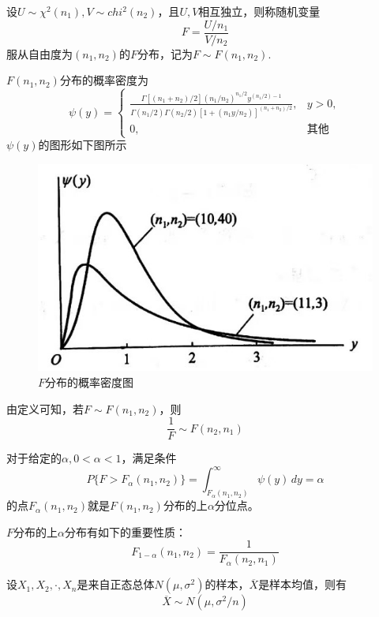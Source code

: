 \begin{definition}[$F$分布]
    设$U\sim \chi^2(n_1),V\sim chi^2(n_2)$，且$U,V$相互独立，则称随机变量
    $$F=\frac{U/n_1}{V/n_2}$$
    服从自由度为$(n_1,n_2)$的{\heiti $F$分布}，记为$F\sim F(n_1,n_2)$.

    $F(n_1,n_2)$分布的概率密度为
    $$\psi (y)=\left\{\begin{array}{ll}
        \frac{\Gamma[(n_1+n_2)/2](n_1/n_2)^{n_1/2} y^{(n_1/2)-1}}{\Gamma(n_1/2)\Gamma(n_2/2)[1+(n_1y/n_2)]^{(n_1+n_2)/2}}, & y>0,\\
        0, & \mbox{其他} 
    \end{array}\right.$$
    $\psi(y)$的图形如下图所示
    \begin{figure}[H]
        \centering
        \includegraphics[scale=0.5]{3.jpg}
        \caption{$F$分布的概率密度图}
    \end{figure} 

    由定义可知，若$F\sim F(n_1,n_2)$，则
    $$\frac{1}{F}\sim F(n_2,n_1)$$
\end{definition}

\begin{definition}[$F$分布的上分位点]
    对于给定的$\alpha,0<\alpha<1$，满足条件
    $$P\{F>F_\alpha(n_1,n_2)\}=\int_{F_\alpha(n_1,n_2)}^\infty \psi(y)\,dy=\alpha$$
    的点$F_\alpha(n_1,n_2)$就是$F(n_1,n_2)$分布的上$\alpha$分位点。

    $F$分布的上$\alpha$分布有如下的重要性质：
    $$F_{1-\alpha}(n_1,n_2)=\frac{1}{F_\alpha(n_2,n_1)}$$
\end{definition}

\begin{theorem}
    设$X_1,X_2,\cdot,X_n$是来自正态总体$N(\mu,\sigma^2)$的样本，$\overline{X}$是样本均值，则有
    $$\overline{X}\sim N(\mu,\sigma^2/n)$$
\end{theorem}


